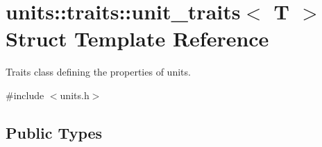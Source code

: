 \hypertarget{structunits_1_1traits_1_1unit__traits}{}\section{units\+:\+:traits\+:\+:unit\+\_\+traits$<$ T $>$ Struct Template Reference}
\label{structunits_1_1traits_1_1unit__traits}


Traits class defining the properties of units.  




{\ttfamily \#include $<$units.\+h$>$}

\subsection*{Public Types}
